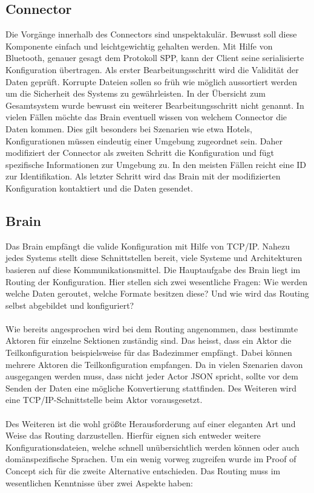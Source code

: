\subsection{Connector}
Die Vorgänge innerhalb des Connectors sind unspektakulär. Bewusst soll diese Komponente einfach und leichtgewichtig gehalten werden. Mit Hilfe von Bluetooth, genauer gesagt dem Protokoll SPP, kann der Client seine serialisierte Konfiguration übertragen. Als erster Bearbeitungsschritt wird die Validität der Daten geprüft. Korrupte Dateien sollen so früh wie möglich aussortiert werden um die Sicherheit des Systems zu gewährleisten. In der Übersicht zum Gesamtsystem wurde bewusst ein weiterer Bearbeitungsschritt nicht genannt. In vielen Fällen möchte das Brain eventuell wissen von welchem Connector die Daten kommen. Dies gilt besonders bei Szenarien wie etwa Hotels, Konfigurationen müssen eindeutig einer Umgebung zugeordnet sein. Daher modifiziert der Connector als zweiten Schritt die Konfiguration und fügt spezifische Informationen zur Umgebung zu. In den meisten Fällen reicht eine ID zur Identifikation. Als letzter Schritt wird das Brain mit der modifizierten Konfiguration kontaktiert und die Daten gesendet. 

\subsection{Brain}

Das Brain empfängt die valide Konfiguration mit Hilfe von TCP/IP. Nahezu jedes Systems stellt diese Schnittstellen bereit, viele Systeme und Architekturen basieren auf diese Kommunikationsmittel.
Die Hauptaufgabe des Brain liegt im Routing der Konfiguration. Hier stellen sich zwei wesentliche Fragen: Wie werden welche Daten geroutet, welche Formate besitzen diese? Und wie wird das Routing selbst abgebildet und konfiguriert? 
\\\\
Wie bereits angesprochen wird bei dem Routing angenommen, dass bestimmte Aktoren für einzelne Sektionen zuständig sind. Das heisst, dass ein Aktor die Teilkonfiguration beispielsweise für das Badezimmer empfängt. Dabei können mehrere Aktoren die Teilkonfiguration empfangen. Da in vielen Szenarien davon ausgegangen werden muss, dass nicht jeder Actor JSON spricht, sollte vor dem Senden der Daten eine mögliche Konvertierung stattfinden. Des Weiteren wird eine TCP/IP-Schnittstelle beim Aktor vorausgesetzt. 
\\\\
Des Weiteren ist die wohl größte Herausforderung auf einer eleganten Art und Weise das Routing darzustellen. Hierfür eignen sich entweder weitere Konfigurationsdateien, welche schnell unübersichtlich werden können oder auch domänspezifische Sprachen. Um ein wenig vorweg zugreifen wurde im Proof of Concept sich für die zweite Alternative entschieden. Das Routing muss im wesentlichen Kenntnisse über zwei Aspekte haben: 

